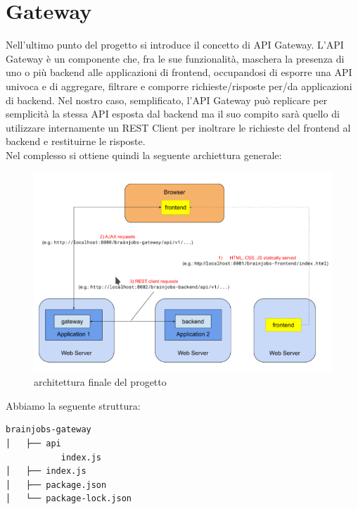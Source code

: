 \documentclass[a4paper,12pt, oneside]{book}
\begin{document}
\chapter{Gateway}
Nell'ultimo punto del progetto si introduce il concetto di API Gateway. L’API Gateway è un componente che, fra le sue funzionalità, maschera la presenza di uno o
più backend alle applicazioni di frontend, occupandosi di esporre una API univoca e di
aggregare, filtrare e comporre richieste/risposte per/da applicazioni di backend.
Nel nostro caso, semplificato, l’API Gateway può replicare per semplicità la stessa API esposta dal
backend ma il suo compito sarà quello di utilizzare internamente un REST Client per
inoltrare le richieste del frontend al backend e restituirne le risposte.\\
Nel complesso si ottiene quindi la seguente archiettura generale:
\begin{figure}[h!]
  \centering
  \includegraphics[scale = 0.68]{img/arch.png}
  \caption{architettura finale del progetto}
\end{figure}
\newpage
Abbiamo la seguente struttura:
\begin{shaded} 
\begin{verbatim}
brainjobs-gateway
│   ├── api
           index.js
│   ├── index.js
│   ├── package.json
│   └── package-lock.json
\end{verbatim}
\end{shaded}
\end{document}

